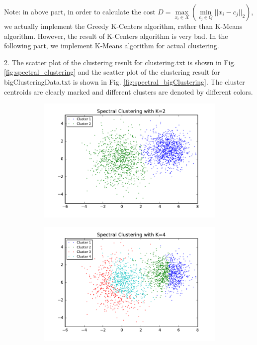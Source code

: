 \begin{description}
\begin{description}
Note: in above part, in order to calculate the cost $D = \underset{x_i \in X}{\max}( \underset{c_j \in Q}{\min}{||x_i - c_j||_2})$, we actually implement the Greedy K-Centers algorithm, rather than K-Means algorithm. However, the result of K-Centers algorithm is very bad. In the following part, we implement K-Means algorithm for actual clustering. \\


\item{2.} The scatter plot of the clustering result for clustering.txt is shown in Fig. \ref{fig:spectral_clustering} and the scatter plot of the clustering result for bigClusteringData.txt is shown in Fig. \ref{fig:spectral_bigClustering}. The cluster centroids are clearly marked and different clusters are denoted by different colors. 

\begin{figure}[!h]
        \centering
        \begin{subfigure}[b]{0.475\textwidth}
            \centering
            \includegraphics[width=\textwidth]{./figures/clustering_spectral_2.pdf}
        \end{subfigure}
        \hfill
        \begin{subfigure}[b]{0.475\textwidth}  
            \centering 
            \includegraphics[width=\textwidth]{./figures/clustering_spectral_4.pdf}

\end{subfigure}
\end{figure}
\end{description}
\end{description}
